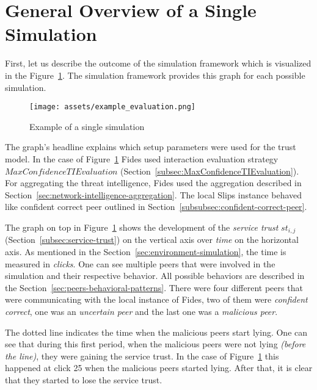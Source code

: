 \section{General Overview of a Single Simulation}
\label{sec:general-overview-of-simulation-output}
First, let us describe the outcome of the simulation framework which is visualized in the Figure~\ref{fig:single-simulation-example}.
The simulation framework provides this graph for each possible simulation.

\begin{figure}
    \centering
    \texttt{[image: assets/example\_evaluation.png]}
    \caption{Example of a single simulation}
    \label{fig:single-simulation-example}
\end{figure}

The graph's headline explains which setup parameters were used for the trust model. In the case of Figure~\ref{fig:single-simulation-example} Fides used interaction evaluation strategy $MaxConfidenceTIEvaluation$ (Section~\ref{subsec:MaxConfidenceTIEvaluation}).
For aggregating the threat intelligence, Fides used the aggregation described in  Section~\ref{sec:network-intelligence-aggregation}.
The local Slips instance behaved like confident correct peer outlined in  Section~\ref{subsubsec:confident-correct-peer}.

The graph on top in Figure~\ref{fig:single-simulation-example} shows the development of the \textit{service trust} $st_{i, j}$ (Section~\ref{subsec:service-trust}) on the vertical axis over \textit{time} on the horizontal axis. As mentioned in the Section~\ref{sec:environment-simulation}, the time is measured in \textit{clicks}.
One can see multiple peers that were involved in the simulation and their respective behavior. All possible behaviors are described in the Section~\ref{sec:peers-behavioral-patterns}.
There were four different peers that were communicating with the local instance of Fides, two of them were \textit{confident correct}, one was an \textit{uncertain peer} and the last one was a \textit{malicious peer}.

The dotted line indicates the time when the malicious peers start lying.
One can see that during this first period, when the malicious peers were not lying \textit{(before the line)}, they were gaining the service trust.
In the case of Figure~\ref{fig:single-simulation-example} this happened at click 25 when the malicious peers started lying.
After that, it is clear that they started to lose the service trust.


